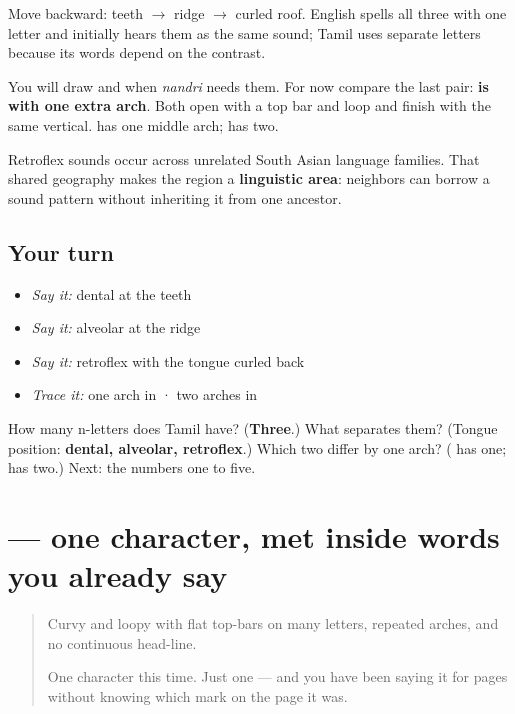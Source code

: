 Move backward: teeth $\to$ ridge $\to$ curled roof. English spells all three with one letter and initially hears them as the same sound; Tamil uses separate letters because its words depend on the contrast.

You will draw  and  when \emph{nandri} needs them. For now compare the last pair: \textbf{ is  with one extra arch}. Both open with a top bar and loop and finish with the same vertical.  has one middle arch;  has two.

Retroflex sounds occur across unrelated South Asian language families. That shared geography makes the region a \textbf{linguistic area}: neighbors can borrow a sound pattern without inheriting it from one ancestor.

\subsection*{Your turn}
\begin{itemize}
\raggedright
  \item \emph{Say it:} dental  at the teeth
  \item \emph{Say it:} alveolar  at the ridge
  \item \emph{Say it:} retroflex  with the tongue curled back
  \item \emph{Trace it:} one arch in  · two arches in 
\end{itemize}

\begin{tcolorbox}[breakable,colback=teal!4,colframe=teal!35!black,title={Before you move on}]
How many n-letters does Tamil have? (\textbf{Three}.) What separates them? (Tongue position: \textbf{dental, alveolar, retroflex}.) Which two differ by one arch? (\textbf{} has one; \textbf{} has two.) Next: the numbers one to five.
\end{tcolorbox}
\section[\texorpdfstring{\ta{ப} (pa)}{ப (pa)}]{ — one character, met inside words you already say}

\label{lesson:TA-S101-letter-pa}



\begin{quote}
Curvy and loopy with flat top-bars on many letters, repeated arches, and no continuous head-line.

One character this time. Just one — and you have been saying it for pages without knowing which mark on the page it was.
\end{quote}

